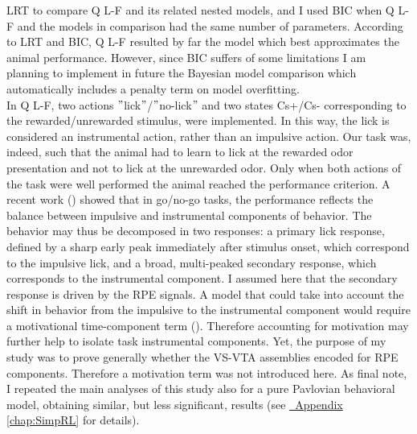 LRT to compare Q L-F and its related nested models, and I used BIC when Q L-F and the models in comparison had the same number of parameters. According to LRT and BIC, Q L-F resulted by far the model which best approximates the animal performance. However, since BIC suffers of some limitations I am planning to implement in future the Bayesian model comparison which automatically includes a penalty term on model overfitting.\\In Q L-F, two actions $"$lick$"$/$"$no-lick$"$ and two states Cs+/Cs- corresponding to the rewarded/unrewarded stimulus, were implemented. In this way, the lick is considered an instrumental action, rather than an impulsive action. Our task was, indeed, such that the animal had to learn to lick at the rewarded odor presentation and not to lick at the unrewarded odor. Only when both actions of the task were well performed the animal reached the performance criterion. A recent work (\cite{SchultzMot}) showed that in go/no-go tasks, the performance reflects the balance between impulsive and instrumental components of behavior. The behavior may thus be decomposed in two responses: a primary lick response, defined by a sharp early peak immediately after stimulus onset, which correspond to the impulsive lick, and a broad, multi-peaked secondary response, which corresponds to the instrumental component. I assumed here that the secondary response is driven by the RPE signals. A model that could take into account the shift in behavior from the impulsive to the instrumental component would require a motivational time-component term (\cite{SchultzMot}). Therefore accounting for motivation may further help to isolate task instrumental components. Yet, the purpose of my study was to prove generally whether the VS-VTA assemblies encoded for RPE components. Therefore a motivation term was not introduced here. As final note, I repeated the main analyses of this study also for a pure Pavlovian behavioral model, obtaining similar, but less significant, results (see \hyperref[chap:SimpRL]{~Appendix \ref*{chap:SimpRL}} for details).\\\\
